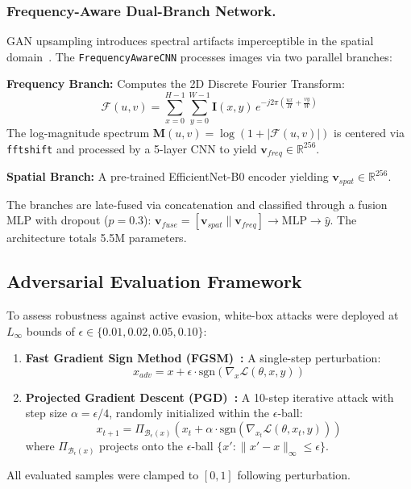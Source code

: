 \documentclass[runningheads]{llncs}
\begin{document}
\subsubsection{Frequency-Aware Dual-Branch Network.}
GAN upsampling introduces spectral artifacts imperceptible in the spatial domain~\cite{frequency_analysis}. The \texttt{FrequencyAwareCNN} processes images via two parallel branches:

\textbf{Frequency Branch:} Computes the 2D Discrete Fourier Transform:
\begin{equation}
    \mathcal{F}(u,v) = \sum_{x=0}^{H-1} \sum_{y=0}^{W-1} \mathbf{I}(x,y) \, e^{-j2\pi\left(\frac{ux}{H} + \frac{vy}{W}\right)}
\end{equation}
The log-magnitude spectrum $\mathbf{M}(u,v) = \log(1 + |\mathcal{F}(u,v)|)$ is centered via \texttt{fftshift} and processed by a 5-layer CNN to yield $\mathbf{v}_{freq} \in \mathbb{R}^{256}$.

\textbf{Spatial Branch:} A pre-trained EfficientNet-B0 encoder yielding $\mathbf{v}_{spat} \in \mathbb{R}^{256}$.

The branches are late-fused via concatenation and classified through a fusion MLP with dropout ($p=0.3$):
$\mathbf{v}_{fuse} = [\mathbf{v}_{spat} \parallel \mathbf{v}_{freq}] \rightarrow \text{MLP} \rightarrow \hat{y}$.
The architecture totals 5.5M parameters.

\subsection{Adversarial Evaluation Framework}
To assess robustness against active evasion, white-box attacks were deployed at $L_\infty$ bounds of $\epsilon \in \{0.01, 0.02, 0.05, 0.10\}$:
\begin{enumerate}
    \item \textbf{Fast Gradient Sign Method (FGSM)~\cite{fgsm}:} A single-step perturbation:
    \begin{equation}
        x_{adv} = x + \epsilon \cdot \text{sgn}(\nabla_x \mathcal{L}(\theta, x, y))
    \end{equation}
    \item \textbf{Projected Gradient Descent (PGD)~\cite{pgd}:} A 10-step iterative attack with step size $\alpha = \epsilon/4$, randomly initialized within the $\epsilon$-ball:
    \begin{equation}
        x_{t+1} = \Pi_{\mathcal{B}_\epsilon(x)} \left( x_t + \alpha \cdot \text{sgn}(\nabla_{x_t} \mathcal{L}(\theta, x_t, y)) \right)
    \end{equation}
    where $\Pi_{\mathcal{B}_\epsilon(x)}$ projects onto the $\epsilon$-ball $\{x' : \|x' - x\|_\infty \leq \epsilon\}$.
\end{enumerate}
All evaluated samples were clamped to $[0, 1]$ following perturbation.
\end{document}
